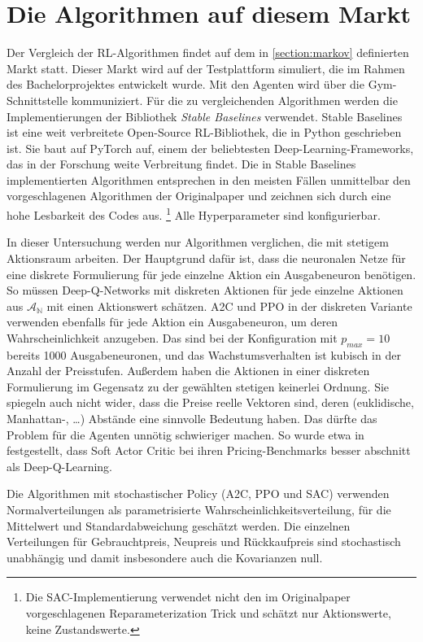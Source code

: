 \section{Die Algorithmen auf diesem Markt}
Der Vergleich der RL-Algorithmen findet auf dem in \ref{section:markov} definierten Markt statt.
Dieser Markt wird auf der Testplattform simuliert, die im Rahmen des Bachelorprojektes entwickelt wurde.
Mit den Agenten wird über die Gym-Schnittstelle \cite{brockman2016openai} kommuniziert.
Für die zu vergleichenden Algorithmen werden die Implementierungen der Bibliothek \textit{Stable Baselines} \cite{stable-baselines} verwendet.
Stable Baselines ist eine weit verbreitete Open-Source RL-Bibliothek, die in Python geschrieben ist.
Sie baut auf PyTorch \cite{NEURIPS2019_9015} auf, einem der beliebtesten Deep-Learning-Frameworks, das in der Forschung weite Verbreitung findet.
Die in Stable Baselines implementierten Algorithmen entsprechen in den meisten Fällen unmittelbar den vorgeschlagenen Algorithmen der Originalpaper und zeichnen sich durch eine hohe Lesbarkeit des Codes aus. \footnote{Die SAC-Implementierung verwendet nicht den im Originalpaper vorgeschlagenen Reparameterization Trick und schätzt nur Aktionswerte, keine Zustandswerte.}
Alle Hyperparameter sind konfigurierbar.

In dieser Untersuchung werden nur Algorithmen verglichen, die mit stetigem Aktionsraum arbeiten.
Der Hauptgrund dafür ist, dass die neuronalen Netze für eine diskrete Formulierung für jede einzelne Aktion ein Ausgabeneuron benötigen.
So müssen Deep-Q-Networks mit diskreten Aktionen für jede einzelne Aktionen aus $\mathcal{A_\mathbb{N}}$ mit einen Aktionswert schätzen.
A2C und PPO in der diskreten Variante verwenden ebenfalls für jede Aktion ein Ausgabeneuron, um deren Wahrscheinlichkeit anzugeben.
Das sind bei der Konfiguration mit $p_{max}=10$ bereits 1000 Ausgabeneuronen, und das Wachstumsverhalten ist kubisch in der Anzahl der Preisstufen.
Außerdem haben die Aktionen in einer diskreten Formulierung im Gegensatz zu der gewählten stetigen keinerlei Ordnung.
Sie spiegeln auch nicht wider, dass die Preise reelle Vektoren sind, deren (euklidische, Manhattan-, \dots) Abstände eine sinnvolle Bedeutung haben.
Das dürfte das Problem für die Agenten unnötig schwieriger machen.
So wurde etwa in \cite{Kastius2022} festgestellt, dass Soft Actor Critic bei ihren Pricing-Benchmarks besser abschnitt als Deep-Q-Learning.

Die Algorithmen mit stochastischer Policy (A2C, PPO und SAC) verwenden Normalverteilungen als parametrisierte Wahrscheinlichkeitsverteilung, für die Mittelwert und Standardabweichung geschätzt werden.
Die einzelnen Verteilungen für Gebrauchtpreis, Neupreis und Rückkaufpreis sind stochastisch unabhängig und damit insbesondere auch die Kovarianzen null.

